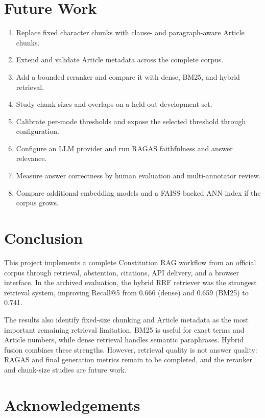 \documentclass[11pt]{article}
\begin{document}
\section{Future Work}

\begin{enumerate}[nosep]
  \item Replace fixed character chunks with clause- and paragraph-aware Article chunks.
  \item Extend and validate Article metadata across the complete corpus.
  \item Add a bounded reranker and compare it with dense, BM25, and hybrid retrieval.
  \item Study chunk sizes and overlaps on a held-out development set.
  \item Calibrate per-mode thresholds and expose the selected threshold through configuration.
  \item Configure an LLM provider and run RAGAS faithfulness and answer relevance.
  \item Measure answer correctness by human evaluation and multi-annotator review.
  \item Compare additional embedding models and a FAISS-backed ANN index if the corpus grows.
\end{enumerate}

\section{Conclusion}

This project implements a complete Constitution RAG workflow from an official corpus through retrieval, abstention, citations, API delivery, and a browser interface. In the archived evaluation, the hybrid RRF retriever was the strongest retrieval system, improving Recall@5 from 0.666 (dense) and 0.659 (BM25) to 0.741.

The results also identify fixed-size chunking and Article metadata as the most important remaining retrieval limitation. BM25 is useful for exact terms and Article numbers, while dense retrieval handles semantic paraphrases. Hybrid fusion combines these strengths. However, retrieval quality is not answer quality: RAGAS and final generation metrics remain to be completed, and the reranker and chunk-size studies are future work.

\section*{Acknowledgements}
\end{document}
